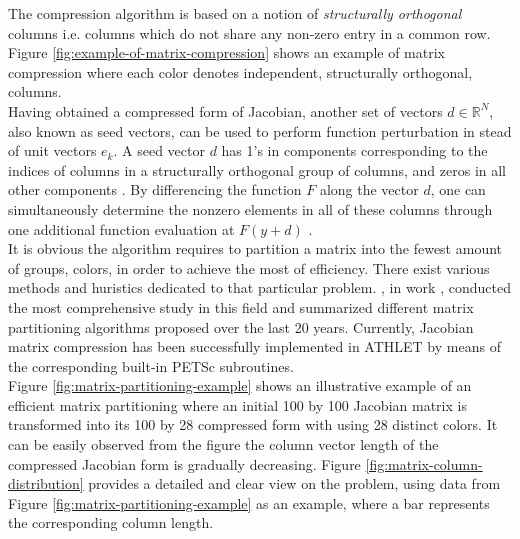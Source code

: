 The compression algorithm is based on a notion of \textit{structurally orthogonal} columns i.e. columns which do not share any non-zero entry in a common row. Figure \ref{fig:example-of-matrix-compression} shows an example of matrix compression where each color denotes independent, structurally orthogonal, columns.\\




Having obtained a compressed form of Jacobian, another set of vectors $d \in \mathbb{R}^{N}$, also known as seed vectors, can be used to perform function perturbation in stead of unit vectors $e_{k}$. A seed vector $d$ has 1’s in components corresponding to the indices of columns in a structurally orthogonal group of columns, and zeros in all other components \cite{gebremedhin2005color}. By differencing the function $F$ along the vector $d$, one can simultaneously determine the nonzero elements in all of these columns through one additional function evaluation at $F(y+d)$ \cite{gebremedhin2005color}.\\


It is obvious the algorithm requires to partition a matrix into the fewest amount of groups, colors, in order to achieve the most of efficiency. There exist various methods and huristics dedicated to that particular problem. \citeauthor{gebremedhin2005color}, in work \cite{gebremedhin2005color}, conducted the most comprehensive study in this field and summarized different matrix partitioning algorithms proposed over the last 20 years. Currently, Jacobian matrix compression has been successfully implemented in ATHLET by means of the corresponding built-in PETSc subroutines.\\


Figure \ref{fig:matrix-partitioning-example} shows an illustrative example of an efficient matrix partitioning where an initial 100 by 100 Jacobian matrix is transformed into its 100 by 28 compressed form with using 28 distinct colors. It can be easily observed from the figure the column vector length of the compressed Jacobian form is gradually decreasing. Figure \ref{fig:matrix-column-distribution} provides a detailed and clear view on the problem, using data from Figure \ref{fig:matrix-partitioning-example} as an example, where a bar represents  the corresponding column length.\\


